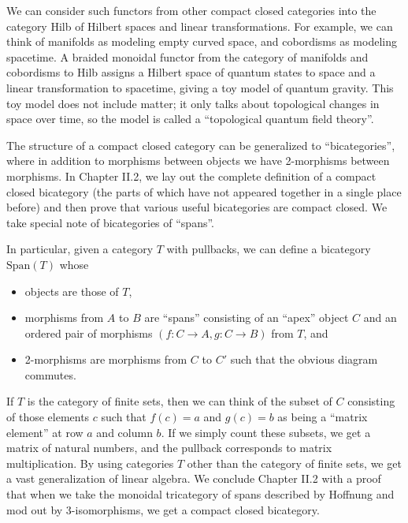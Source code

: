 \documentclass[12pt,twoside,openright]{report}
\newcommand{\Span}{\mbox{Span}}
\begin{document}
We can consider such functors from other compact closed categories into the category Hilb of Hilbert spaces and linear transformations.  For example, we can think of manifolds as modeling empty curved space, and cobordisms as modeling spacetime.  A braided monoidal functor from the category of manifolds and cobordisms to Hilb assigns a Hilbert space of quantum states to space and a linear transformation to spacetime, giving a toy model of quantum gravity.  This toy model does not include matter; it only talks about topological changes in space over time, so the model is called a ``topological quantum field theory''.

The structure of a compact closed category can be generalized to ``bicategories'', where in addition to morphisms between objects we have 2-morphisms between morphisms.  In Chapter II.2, we lay out the complete definition of a compact closed bicategory (the parts of which have not appeared together in a single place before) and then prove that various useful bicategories are compact closed.  We take special note of bicategories of ``spans''.

In particular, given a category $T$ with pullbacks, we can define a bicategory $\Span(T)$ whose
\begin{itemize}
  \item objects are those of $T$,
  \item morphisms from $A$ to $B$ are ``spans'' consisting of an ``apex'' object $C$ and an ordered pair of morphisms $(f:C\to A, g:C \to B)$ from $T$, and
  \item 2-morphisms are morphisms from $C$ to $C'$ such that the obvious diagram commutes.
\end{itemize}
If $T$ is the category of finite sets, then we can think of the subset of $C$ consisting of those elements $c$ such that $f(c) = a$ and $g(c) = b$ as being a ``matrix element'' at row $a$ and column $b$.  If we simply count these subsets, we get a matrix of natural numbers, and the pullback corresponds to matrix multiplication.  By using categories $T$ other than the category of finite sets, we get a vast generalization of linear algebra.  We conclude Chapter II.2 with a proof that when we take the monoidal tricategory of spans described by Hoffnung \cite{Hoffnung} and mod out by 3-isomorphisms, we get a compact closed bicategory.
\end{document}
